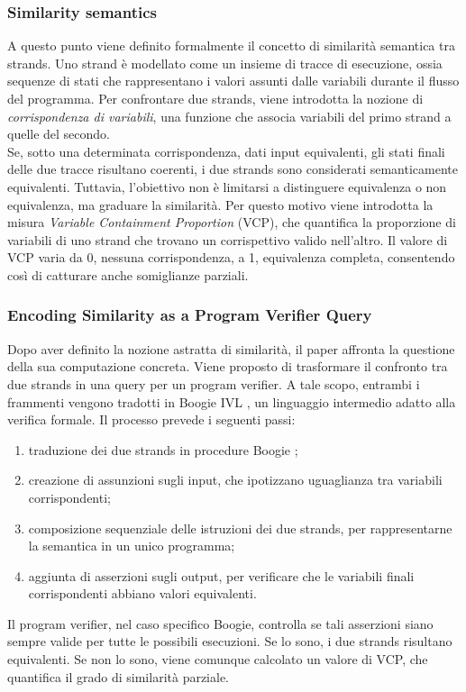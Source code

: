 \documentclass[12pt,a4paper,openright,twoside]{report}
\begin{document}
\subsubsection{Similarity semantics}
A questo punto viene definito formalmente il concetto di similarità semantica tra strands. Uno strand è modellato come un insieme di tracce di esecuzione, ossia sequenze di stati che rappresentano i valori assunti dalle variabili durante il flusso del programma. Per confrontare due strands, viene introdotta la nozione di \textit{corrispondenza di variabili}, una funzione che associa variabili del primo strand a quelle del secondo. \\
Se, sotto una determinata corrispondenza, dati input equivalenti, gli stati finali delle due tracce risultano coerenti, i due strands sono considerati semanticamente equivalenti. Tuttavia, l’obiettivo non è limitarsi a distinguere equivalenza o non equivalenza, ma graduare la similarità. Per questo motivo viene introdotta la misura \textit{Variable Containment Proportion} (VCP), che quantifica la proporzione di variabili di uno strand che trovano un corrispettivo valido nell’altro. Il valore di VCP varia da 0, nessuna corrispondenza, a 1, equivalenza completa, consentendo così di catturare anche somiglianze parziali.

\subsubsection{Encoding Similarity as a Program Verifier Query}
Dopo aver definito la nozione astratta di similarità, il paper affronta la questione della sua computazione concreta. Viene proposto di trasformare il confronto tra due strands in una query per un program verifier. A tale scopo, entrambi i frammenti vengono tradotti in Boogie IVL \cite{boogie}, un linguaggio intermedio adatto alla verifica formale. Il processo prevede i seguenti passi:
\begin{enumerate}
    \item traduzione dei due strands in procedure Boogie \cite{boogie};
    \item creazione di assunzioni sugli input, che ipotizzano uguaglianza tra variabili corrispondenti;
    \item composizione sequenziale delle istruzioni dei due strands, per rappresentarne la semantica in un unico programma;
    \item aggiunta di asserzioni sugli output, per verificare che le variabili finali corrispondenti abbiano valori equivalenti.
\end{enumerate}
Il program verifier, nel caso specifico Boogie, controlla se tali asserzioni siano sempre valide per tutte le possibili esecuzioni. Se lo sono, i due strands risultano equivalenti. Se non lo sono, viene comunque calcolato un valore di VCP, che quantifica il grado di similarità parziale.
\end{document}
